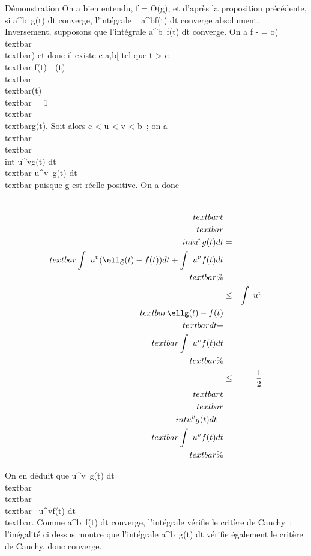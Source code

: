 Démonstration On a bien entendu, f = O(g), et d'après la proposition
précédente, si \int  a^b~g(t) dt
converge, l'intégrale \int ~
a^bf(t) dt converge absolument. Inversement, supposons
que l'intégrale \int  a^b~f(t) dt
converge. On a f - \ellg =
o(\\textbar{}\ellg\\textbar{}) et donc il
existe c \in {[}a,b{[} tel que t \textgreater{} c
\rigtharrow~\\textbar{} f(t) - \ellg(t)\\textbar{} 
\\textbar{}\ellg(t)\\textbar{} = 1
\\textbar{}\ell\\textbar{}g(t). Soit alors c
\textless{} u \textless{} v \textless{} b~; on a
\\textbar{}\ell\\textbar{}\\int
 u^vg(t) dt =\\textbar{}
\ell\int  u^v~g(t)
dt\\textbar{} puisque g est réelle positive. On a donc

\begin{align*}
\\textbar{}\ell\\textbar{}\\int
 u^vg(t) dt& =&
\\textbar{}\int ~
u^v(\ellg(t) - f(t)) dt +\int ~
u^vf(t) dt\\textbar{}\%&
\\ & \leq& \int ~
u^v\\textbar{}\ellg(t) -
f(t)\\textbar{} dt
+\\textbar{}\int ~
u^vf(t) dt\\textbar{} \%&
\\ & \leq& 1 \over 2
\\textbar{}\ell\\textbar{}\\int
 u^vg(t) dt
+\\textbar{}\int ~
u^vf(t) dt\\textbar{} \%&
\\ \end{align*}

On en déduit que \int  u^v~g(t)
dt  \over
\\textbar{}\ell\\textbar{}
\\textbar{}\int ~
u^vf(t) dt\\textbar{}. Comme
\int  a^b~f(t) dt converge,
l'intégrale vérifie le critère de Cauchy~; l'inégalité ci dessus montre
que l'intégrale \int  a^b~g(t) dt
vérifie également le critère de Cauchy, donc converge.

